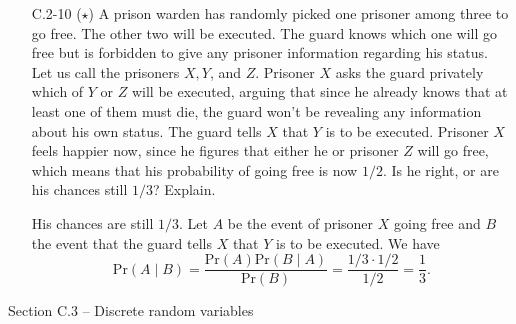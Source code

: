 \begin{enumerate}
\item[C.2{-}10] {($\star$) A prison warden has randomly picked one prisoner
  among three to go free. The other two will be executed. The guard knows which
  one will go free but is forbidden to give any prisoner information regarding
  his status. Let us call the prisoners $X, Y$, and $Z$. Prisoner $X$ asks the
  guard privately which of $Y$ or $Z$ will be executed, arguing that since he
  already knows that at least one of them must die, the guard won't be revealing
  any information about his own status. The guard tells $X$ that $Y$ is to be
  executed.  Prisoner $X$ feels happier now, since he figures that either he or
  prisoner $Z$ will go free, which means that his probability of going free is
  now $1/2$. Is he right, or are his chances still $1/3$? Explain.}
\begin{framed}
  His chances are still $1/3$. Let $A$ be the event of prisoner $X$ going free
  and $B$ the event that the guard tells $X$ that $Y$ is to be executed. We have
  \[
    \text{Pr}(A\;|\;B) = \frac{\text{Pr}(A) \text{Pr}(B\;|\;A)}{\text{Pr}(B)} = \frac{1/3 \cdot 1/2}{1/2} = \frac{1}{3}.
  \]
\end{framed}

\end{enumerate}

\newpage

{\large Section C.3 {--} Discrete random variables}

